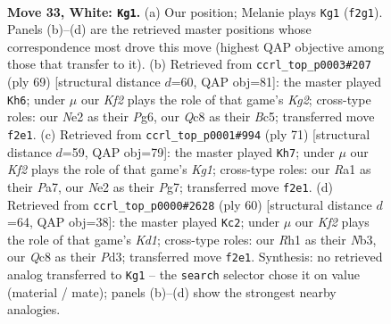 \documentclass[11pt]{article}
\begin{document}
\clearpage

\begin{figure}[p]\centering
\begin{subfigure}{0.46\textwidth}\centering
\resizebox{\linewidth}{!}{%
\newchessgame
\chessboard[
  setfen={2Q5/pp1n2kp/7p/1P6/3P4/3r1q2/4NK2/R6R w - - 1 33},
  showmover=false,
  pgfstyle=straightmove, color=movearrow, markmove={f2-g1}
]}
\caption{}
\end{subfigure}\hfill
\begin{subfigure}{0.46\textwidth}\centering
\resizebox{\linewidth}{!}{%
\newchessgame
\chessboard[
  setfen={7r/5Qk1/6p1/p1b5/P7/2P2P2/B4PKP/4q3 b - - 0 35},
  showmover=false,
  pgfstyle=straightmove, color=movearrow, markmove={g7-h6}
]}
\caption{}
\end{subfigure}
\\[4pt]
\begin{subfigure}{0.46\textwidth}\centering
\resizebox{\linewidth}{!}{%
\newchessgame
\chessboard[
  setfen={6k1/p4Qp1/3p3p/2r5/8/1P6/P1q3PP/5R1K b - - 0 36},
  showmover=false,
  pgfstyle=straightmove, color=movearrow, markmove={g8-h7}
]}
\caption{}
\end{subfigure}\hfill
\begin{subfigure}{0.46\textwidth}\centering
\resizebox{\linewidth}{!}{%
\newchessgame
\chessboard[
  setfen={3r4/5p2/pk6/1pR5/3p1b1Q/1N1P3P/PP6/3K1q2 w - - 4 31},
  showmover=false,
  pgfstyle=straightmove, color=movearrow, markmove={d1-c2}
]}
\caption{}
\end{subfigure}
\caption{\textbf{Move 33, White: \texttt{Kg1}.} (a) Our position; Melanie plays \texttt{Kg1} (\texttt{f2g1}). Panels (b)--(d) are the retrieved master positions whose correspondence most drove this move (highest QAP objective among those that transfer to it). (b) Retrieved from \texttt{ccrl\_top\_p0003\#207} (ply 69) [structural distance $d$=60, QAP obj=81]: the master played \texttt{Kh6}; under $\mu$ our \emph{Kf2} plays the role of that game's \emph{Kg2}; cross-type roles: our \emph{N}e2 as their \emph{P}g6, our \emph{Q}c8 as their \emph{B}c5; transferred move \texttt{f2e1}. (c) Retrieved from \texttt{ccrl\_top\_p0001\#994} (ply 71) [structural distance $d$=59, QAP obj=79]: the master played \texttt{Kh7}; under $\mu$ our \emph{Kf2} plays the role of that game's \emph{Kg1}; cross-type roles: our \emph{R}a1 as their \emph{P}a7, our \emph{N}e2 as their \emph{P}g7; transferred move \texttt{f2e1}. (d) Retrieved from \texttt{ccrl\_top\_p0000\#2628} (ply 60) [structural distance $d$=64, QAP obj=38]: the master played \texttt{Kc2}; under $\mu$ our \emph{Kf2} plays the role of that game's \emph{Kd1}; cross-type roles: our \emph{R}h1 as their \emph{N}b3, our \emph{Q}c8 as their \emph{P}d3; transferred move \texttt{f2e1}. Synthesis: no retrieved analog transferred to \texttt{Kg1} -- the \texttt{search} selector chose it on value (material / mate); panels (b)--(d) show the strongest nearby analogies.}
\label{fig:thought-m64}
\end{figure}
\end{document}
